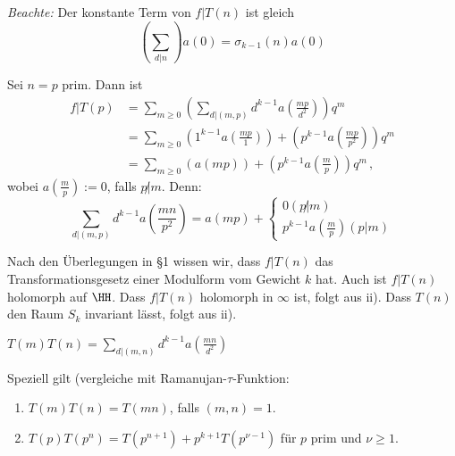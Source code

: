 \emph{Beachte:} Der konstante Term von $f | T(n)$ ist gleich
\[
\left( \sum_{d|n} \right) a(0) = \sigma_{k-1}(n) a(0)
\]

\begin{bsp}
Sei $n = p$ prim. Dann ist
\begin{align*}
f | T(p) &= \sum_{m \geq 0} \left( \sum_{d | (m,p)} d^{k-1} a\left(\frac{mp}{d^2}\right) \right) q^m\\
&= \sum_{m \geq 0} \left( 1^{k-1} a\left(\frac{mp}{1}\right) \right) + \left( p^{k-1} a\left(\frac{mp}{p^2}\right) \right) q^m \\
&= \sum_{m \geq 0} \left( a\left(mp\right) \right) + \left( p^{k-1} a\left(\frac{m}{p}\right) \right) q^m
\,,
\end{align*}
wobei $a\left(\frac mp\right) := 0$, falls $p \not | m$. Denn:
\[
\sum_{d | (m,p)} d^{k-1} a \left( \frac {mn}{p^2} \right) = a \left(mp\right) + \begin{cases} 0 (p \not | m) \\ p^{k-1} a \left(\frac mp \right) (p | m) \end{cases}
\]
\end{bsp}

\begin{bewe-list}
\item Nach den Überlegungen in §1 wissen wir, dass $f | T(n)$ das Transformationsgesetz einer Modulform vom Gewicht $k$ hat. Auch ist $f | T(n)$ holomorph auf $\HH$. Dass $f | T(n)$ holomorph in $\infty$ ist, folgt aus ii). Dass $T(n)$ den Raum $S_k$ invariant lässt, folgt aus ii).
\end{bewe-list}

\begin{satz-list}
\item $T(m) T(n) = \sum_{d | (m,n)} d^{k-1} a \left( \frac {mn}{d^2} \right)$
\end{satz-list}

Speziell gilt (vergleiche mit Ramanujan-$\tau$-Funktion: \begin{enumerate}
\item $T(m) T(n) = T(mn)$, falls $(m,n) = 1$.
\item $T(p) T(p^n) = T(p^{n+1}) + p^{k+1} T(p^{\nu-1})$ für $p$ prim und $\nu \geq 1$.
\end{enumerate}
